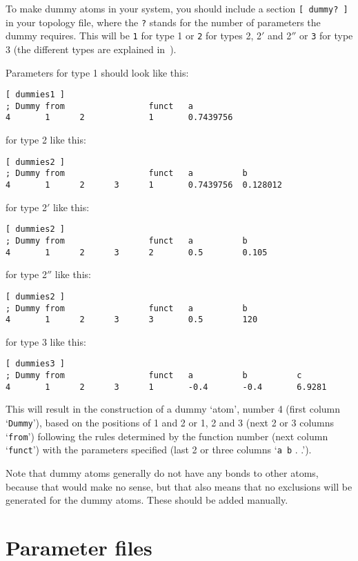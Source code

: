 To make dummy atoms in your system, you should include a section 
\verb'[ dummy? ]' in your topology file, where the \verb'?' stands for
the number of parameters the dummy requires. This will be \verb'1' for
type 1 or \verb'2' for types 2, 2$'$ and 2$''$ or \verb'3' for type 3
(the different types are explained in~).

Parameters for type 1 should look like this:
{\small\begin{verbatim}
[ dummies1 ]
; Dummy from                 funct   a
4       1      2             1       0.7439756
\end{verbatim}}

for type 2 like this:
{\small\begin{verbatim}
[ dummies2 ]
; Dummy from                 funct   a          b
4       1      2      3      1       0.7439756  0.128012
\end{verbatim}}

for type 2$'$ like this:
{\small\begin{verbatim}
[ dummies2 ]
; Dummy from                 funct   a          b
4       1      2      3      2       0.5        0.105
\end{verbatim}}

for type 2$''$ like this:
{\small\begin{verbatim}
[ dummies2 ]
; Dummy from                 funct   a          b
4       1      2      3      3       0.5        120
\end{verbatim}}

for type 3 like this:
{\small\begin{verbatim}
[ dummies3 ]
; Dummy from                 funct   a          b          c
4       1      2      3      1       -0.4       -0.4       6.9281
\end{verbatim}}

This will result in the construction of a dummy `atom', number 4
(first column `\verb'Dummy''), based on the positions of 1 and 2 or 1,
2 and 3 (next 2 or 3 columns `\verb'from'') following the rules
determined by the function number (next column `\verb'funct'') with
the parameters specified (last 2 or three columns `\verb'a b' . .').

Note that dummy atoms generally do not have any bonds to other atoms,
because that would make no sense, but that also means that no
exclusions will be generated for the dummy atoms. These should be
added manually.

\section{Parameter files}
\label{sec:paramfiles}
